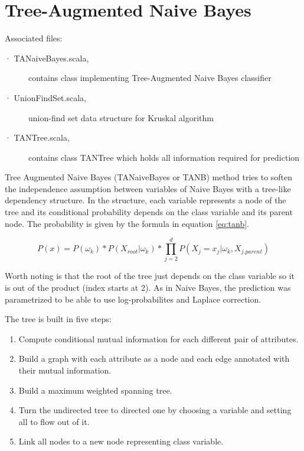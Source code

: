 \documentclass[a4paper,10pt]{article}
\begin{document}
\section{Tree-Augmented Naive Bayes}
Associated files:
\begin{description}
 \item [· TANaiveBayes.scala,] contains class implementing Tree-Augmented Naive Bayes classifier
 \item [· UnionFindSet.scala,] union-find set data structure for Kruskal algorithm \cite{Kruskal1956}
 \item [· TANTree.scala,] contains class TANTree which holds all information required for prediction
\end{description}

Tree Augmented Naive Bayes \cite{Uther2011} (TANaiveBayes or TANB) method tries to soften the independence assumption between variables of Naive Bayes with a tree-like dependency structure. In the structure, each variable represents a node of the tree and its conditional probability depends on the class variable and its parent node. The probability is given by the formula in equation \ref{eq:tanb}.

\begin{equation} \label{eq:tanb}
 P(x) = P(\omega_k) * P(X_{root}|\omega_k) * \prod_{j=2}^d  P(X_j=x_j|\omega_k, X_{j.parent})
\end{equation}

Worth noting is that the root of the tree just depends on the class variable so it is out of the product (index starts at 2). As in Naive Bayes, the prediction was parametrized to be able to use log-probabilites and Laplace correction. 

The tree is built in five steps:

\begin{enumerate}
 \item Compute conditional mutual information for each different pair of attributes.
 \item Build a graph with each attribute as a node and each edge annotated with their mutual information.
 \item Build a maximum weighted spanning tree.
 \item Turn the undirected tree to directed one by choosing a variable and setting all to flow out of it.
 \item Link all nodes to a new node representing class variable.
\end{enumerate}
\end{document}
